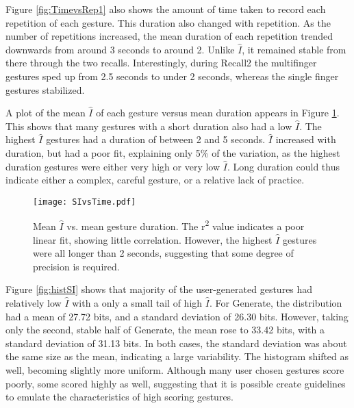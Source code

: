 \documentclass{sig-alternate-10pt}
\begin{document}
  
  


Figure \ref{fig:TimevsRep1} also shows the amount of time taken to record each repetition of each gesture. This duration also changed with repetition. As the number of repetitions increased, the mean duration of each repetition trended downwards from around 3 seconds to around 2. Unlike $\hat{I}$, it remained stable from there through the two recalls. Interestingly, during Recall2 the multifinger gestures sped up from 2.5 seconds to under 2 seconds, whereas the single finger gestures stabilized.
        


 



A plot of the mean  $\hat{I}$ of each gesture versus mean duration appears in Figure \ref{fig:SIvsTime1}. This shows that many gestures with a short duration also had a low  $\hat{I}$. The highest  $\hat{I}$ gestures had a duration of between 2 and 5 seconds.  $\hat{I}$ increased with duration, but had a poor fit, explaining only 5\% of the variation, as the highest duration gestures were either very high or very low  $\hat{I}$. Long duration could thus indicate either a complex, careful gesture, or a relative lack of practice.
  
  
  



  
  
  \begin{figure}[!h]
  \centering
  \texttt{[image: SIvsTime.pdf]}
\caption{Mean  $\hat{I}$  vs. mean gesture duration. The r\textsuperscript{2} value indicates a poor linear fit, showing little correlation. However, the highest $\hat{I}$ gestures were all longer than 2 seconds, suggesting that some degree of precision is required.}
  \label{fig:SIvsTime1}
  \end{figure}
  










Figure \ref{fig:histSI} shows that majority of the user-generated gestures had relatively low $\hat{I}$ with a only a small tail of high $\hat{I}$. For Generate, the distribution had a mean of 27.72 bits, and a standard deviation of 26.30 bits. However, taking only the second, stable half of Generate, the mean rose to 33.42 bits, with a standard deviation of 31.13 bits. In both cases, the standard deviation was about the same size as the mean, indicating a large variability. The histogram shifted as well, becoming slightly more uniform. Although many user chosen gestures score poorly, some scored highly as well, suggesting that it is possible create guidelines to emulate the characteristics of high scoring gestures.
\end{document}
